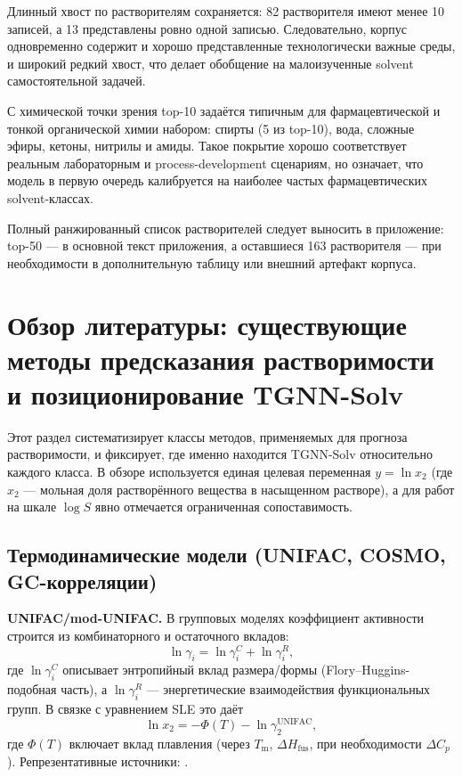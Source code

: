 \documentclass[11pt]{article}
\begin{document}
Длинный хвост по растворителям сохраняется: 82 растворителя имеют менее 10 записей, а 13 представлены ровно одной записью. Следовательно, корпус одновременно содержит и хорошо представленные технологически важные среды, и широкий редкий хвост, что делает обобщение на малоизученные solvent самостоятельной задачей.

С химической точки зрения top-10 задаётся типичным для фармацевтической и тонкой органической химии набором: спирты (5 из top-10), вода, сложные эфиры, кетоны, нитрилы и амиды. Такое покрытие хорошо соответствует реальным лабораторным и process-development сценариям, но означает, что модель в первую очередь калибруется на наиболее частых фармацевтических solvent-классах.

Полный ранжированный список растворителей следует выносить в приложение: top-50 --- в основной текст приложения, а оставшиеся 163 растворителя --- при необходимости в дополнительную таблицу или внешний артефакт корпуса.

\section{Обзор литературы: существующие методы предсказания растворимости и позиционирование TGNN-Solv}

Этот раздел систематизирует классы методов, применяемых для прогноза растворимости, и фиксирует, где именно находится TGNN-Solv относительно каждого класса. В обзоре используется единая целевая переменная $y=\ln x_2$ (где $x_2$ --- мольная доля растворённого вещества в насыщенном растворе), а для работ на шкале $\log S$ явно отмечается ограниченная сопоставимость.

\subsection{Термодинамические модели (UNIFAC, COSMO, GC-корреляции)}
\label{subsec:thermo-models-review}

\textbf{UNIFAC/mod-UNIFAC.} В групповых моделях коэффициент активности строится из комбинаторного и остаточного вкладов:
\begin{equation*}
\ln \gamma_i = \ln \gamma_i^{C} + \ln \gamma_i^{R},
\end{equation*}
где $\ln \gamma_i^{C}$ описывает энтропийный вклад размера/формы (Flory--Huggins-подобная часть), а $\ln \gamma_i^{R}$ --- энергетические взаимодействия функциональных групп. В связке с уравнением SLE это даёт
\begin{equation*}
\ln x_2 = -\Phi(T) - \ln \gamma_2^{\text{UNIFAC}},
\end{equation*}
где $\Phi(T)$ включает вклад плавления (через $T_{\mathrm{m}}$, $\Delta H_{\mathrm{fus}}$, при необходимости $\Delta C_p$). Репрезентативные источники: \cite{fredenslund1975,weidlich1987,ddb2024}.
\end{document}
